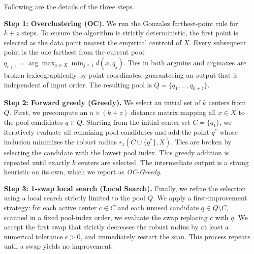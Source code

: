 \documentclass[twoside,leqno,twocolumn]{article}
\begin{document}
Following are the details of the three steps.

\textbf{Step 1: Overclustering (OC).} We run the Gonzalez farthest-point rule for $k+z$ steps. To ensure the algorithm is strictly deterministic, the first point is selected as the data point nearest the empirical centroid of $X$. Every subsequent point is the one farthest from the current pool: $q_{i+1} = \arg \max_{x \in X} \min_{j\le i} d(x,q_j)$. Ties in both argmins and argmaxes are broken lexicographically by point coordinates, guaranteeing an output that is independent of input order. The resulting pool is $Q=\{q_1,\dots,q_{k+z}\}$.

\textbf{Step 2: Forward greedy (Greedy).} We select an initial set of $k$ centers from $Q$. First, we precompute an $n\times(k+z)$ distance matrix mapping all $x \in X$ to the pool candidates $q \in Q$. Starting from the initial center set $C=\{q_1\}$, we iteratively evaluate all remaining pool candidates and add the point $q^*$ whose inclusion minimizes the robust radius $r_z(C \cup \{q^*\}, X)$. Ties are broken by selecting the candidate with the lowest pool index. This greedy addition is repeated until exactly $k$ centers are selected. The intermediate output is a strong heuristic on its own, which we report as {\em OC-Greedy}.

\textbf{Step 3: 1-swap local search (Local Search).} Finally, we refine the selection using a local search strictly limited to the pool $Q$. We apply a first-improvement strategy: for each active center $c \in C$ and each unused candidate $q \in Q\setminus C$, scanned in a fixed pool-index order, we evaluate the swap replacing $c$ with $q$. We accept the first swap that strictly decreases the robust radius by at least a numerical tolerance $\epsilon>0$, and immediately restart the scan. This process repeats until a swap yields no improvement.
\end{document}

